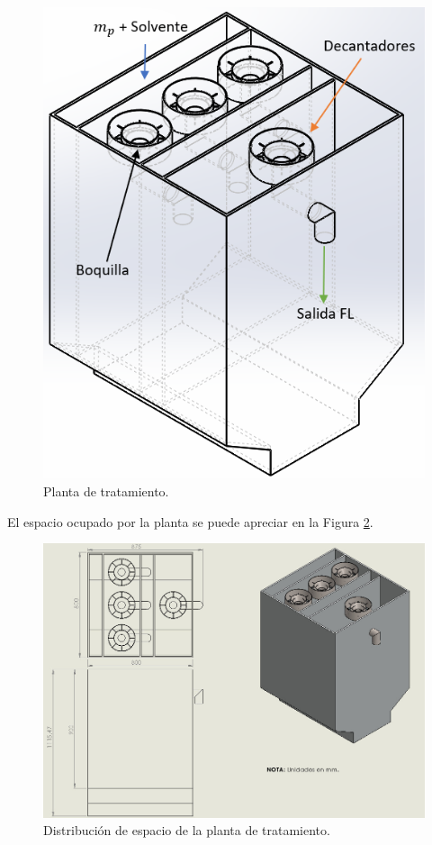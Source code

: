 \begin{figure}[h!]
\begin{minipage}[b]{0.48\textwidth}
	\includegraphics[width=\textwidth]{Images/Elution/filtrado2.PNG}
\end{minipage}
\caption{Planta de tratamiento.}
\label{trat}

\end{figure}


\newpage

\noindent
\justify

El espacio ocupado por la planta se puede apreciar en la Figura \ref{tratplano}.

\begin{figure}[h!]
	\centering
	\includegraphics[width=\textwidth]{Images/Elution/plano_planta.jpeg}
	\caption{Distribuci\'on de espacio de la planta de tratamiento.}
	\label{tratplano}
\end{figure}

